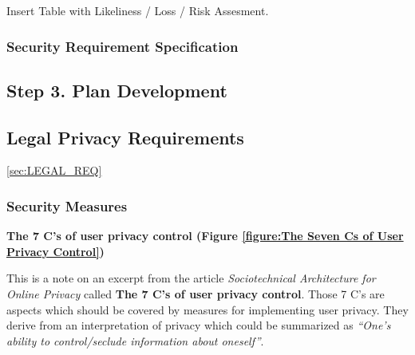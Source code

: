 Insert Table with Likeliness / Loss / Risk Assesment.

\subsubsection{Security Requirement Specification}

\subsection{Step 3. Plan Development}

\subsection{Legal Privacy Requirements} \ref{sec:LEGAL_REQ}

\subsubsection{Security Measures}

\textbf{The 7 C's of user privacy control (Figure \ref{figure:The Seven Cs of User Privacy Control})}

This is a note on an excerpt from the article \emph{Sociotechnical
Architecture for Online Privacy} \cite{1} called
\textbf{The 7 C's of user privacy control}. Those 7 C's are aspects
which should be covered by measures for implementing user privacy. They
derive from an interpretation of privacy which could be summarized as
\emph{``One's ability to control/seclude information about oneself''}.



